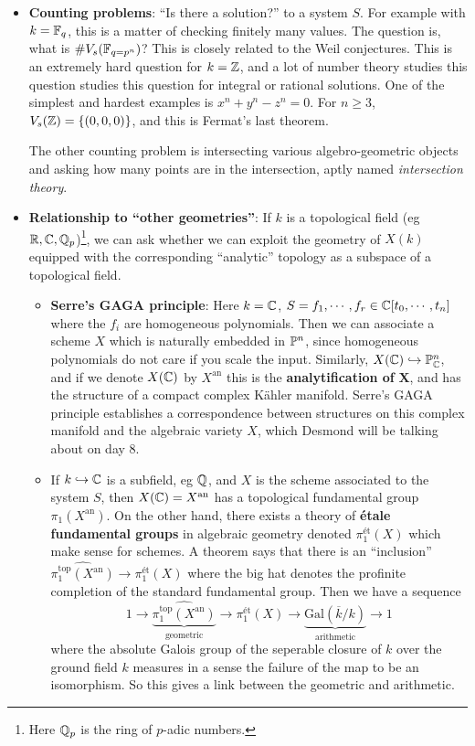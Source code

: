 \begin{itemize}
\setlength\itemsep{-.2em}
    \item \textbf{Counting problems}: ``Is there a solution?'' to a system $S$. For example with $k=\F_q$, this is a matter of checking finitely many values. The question is, what is $\# V_s(\F_{q=p^n })$? This is closely related to the Weil conjectures. This is an extremely hard question for $k=\Z$, and a lot of number theory studies this question studies this question for integral or rational solutions. One of the simplest and hardest examples is $x^n +y^n-z^n =0$. For $n \geq 3$, $V_s(\Z)= \{(0,0,0)\} $, and this is Fermat's last theorem.

        The other counting problem is intersecting various algebro-geometric objects and asking how many points are in the intersection, aptly named \emph{intersection theory}.
    \item \textbf{Relationship to ``other geometries''}: If $k$ is a topological field (eg $\R,\C,\Q_p$)\footnote{Here $\Q_p$ is the ring of $p$-adic numbers.}, we can ask whether we can exploit the geometry of $X(k)$ equipped with the corresponding ``analytic'' topology as a subspace of a topological field.
        \begin{itemize}
            \item \textbf{Serre's GAGA principle}: Here $k=\C$, $S=f_1,\cdots ,f_r \in  \C[t_0, \cdots ,t_n ]$ where the $f_i $ are homogeneous polynomials. Then we can associate a scheme $X$ which is naturally embedded in $\P^n $, since homogeneous polynomials do not care if you scale the input. Similarly, $X(\C) \hookrightarrow \P^n _{\C}$, and if we denote $X(\C)$ by $X^{\mathrm{an}}$ this is the \textbf{analytification of} $\mathbf X$, and has the structure of a compact complex K\"ahler manifold. Serre's GAGA principle establishes a correspondence between structures on this complex manifold and the algebraic variety $X$, which Desmond will be talking about on day 8.
            \item If $k \hookrightarrow \C$ is a subfield, eg $\Q$, and $X$ is the scheme associated to the system $S$, then $X(\C)=X^{\mathrm{an}}$ has a topological fundamental group $\pi_1(X^{\mathrm{an}})$. On the other hand, there exists a theory of \textbf{\'etale fundamental groups} in algebraic geometry denoted $\pi_1 ^{\text{\'et}}(X)$ which make sense for schemes. A theorem says that there is an ``inclusion'' $\widehat{ \pi_1^{\text{top} }(X^{\mathrm{an}})}\to \pi_1^{\text{\'et}}(X)$ where the big hat denotes the profinite completion of the standard fundamental group. Then we have a sequence \[
                    1 \to  \underset{\text{geometric} }{\underbrace{ \widehat{ \pi_1^{\text{top} }(X^{\mathrm{an}})}}} \to \pi_1^{\text{\'et}}(X) \to \underset{\text{arithmetic} }{\underbrace{ \mathrm{Gal}( \overline{k}/k) }} \to 1
                \] where the absolute Galois group of the seperable closure of $k$ over the ground field $k$ measures in a sense the failure of the map to be an isomorphism. So this gives a link between the geometric and arithmetic. 


\end{itemize}
\end{itemize}
